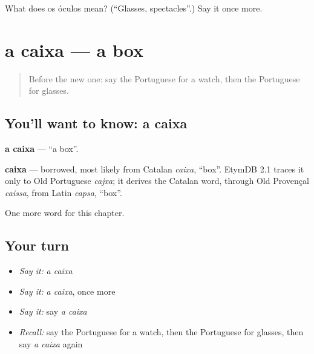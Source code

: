 \begin{tcolorbox}[breakable,colback=teal!4,colframe=teal!35!black,title={Before you move on}]
What does os óculos mean? (\textquotedblleft{}Glasses, spectacles\textquotedblright{}.) Say it once more.
\end{tcolorbox}
\section[a caixa]{a caixa — a box}

\label{lesson:PT-C54-caixa}



\begin{quote}
Before the new one: say the Portuguese for a watch, then the Portuguese for glasses.
\end{quote}

\subsection*{You'll want to know: a caixa}
\textbf{a caixa} — \textquotedblleft{}a box\textquotedblright{}.

\begin{cousinweb}
\textbf{caixa} — borrowed, most likely from Catalan \emph{caixa}, \textquotedblleft{}box\textquotedblright{}. EtymDB 2.1 traces it only to Old Portuguese \emph{cajxa}; it derives the Catalan word, through Old Provençal \emph{caissa}, from Latin \emph{capsa}, \textquotedblleft{}box\textquotedblright{}.
\end{cousinweb}

\begin{grammarlens}[title={What you've built}]
One more word for this chapter.
\end{grammarlens}

\subsection*{Your turn}
\begin{itemize}
\raggedright
  \item \emph{Say it:} \emph{a caixa}
  \item \emph{Say it:} \emph{a caixa}, once more
  \item \emph{Say it:} say \emph{a caixa}
  \item \emph{Recall:} say the Portuguese for a watch, then the Portuguese for glasses, then say \emph{a caixa} again
\end{itemize}

